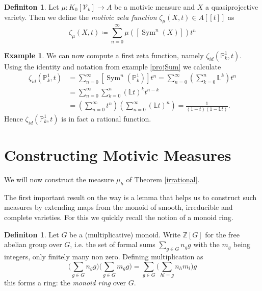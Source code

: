 \documentclass[11pt, a4paper, german]{article}
\theoremstyle{plain}
\theoremstyle{definition}
\newtheorem{definition}[theorem]{Definiton}
\newtheorem{example}[theorem]{Example}
\newcommand{\gring}[1][k]{K_0[\mathcal{V}_#1]}
\DeclareMathOperator{\Sym}{Sym}
\begin{document}
\begin{definition}
    Let $\mu \colon \gring \to A$ be a motivic measure and $X$ a quasiprojective variety. Then we define the \emph{motivic zeta function} 
    $\zeta_{\mu}(X,t) \in A[[t]]$ as
    \[
        \zeta_{\mu}(X,t) \coloneqq \sum_{n=0}^\infty \mu([\Sym^n(X)])t^n
    \]
\end{definition}

\begin{example}
    We can now compute a first zeta function, namely $\zeta_{id}(\mathbb{P}_k^1, t)$. Using the identity and notation from example \ref{projSum}
    we calculate
    \begin{align*}
        \zeta_{id}(\mathbb{P}_k^1, t) & = \sum_{n=0}^\infty \left[\Sym^n({\mathbb{P}_k^1})\right]t^n 
                                       = \sum_{n=0}^\infty \left(\sum_{k=0}^n \mathbb{L}^k\right) t^n \\
                                       & = \sum_{n=0}^\infty \sum_{k=0}^n \left(\mathbb{L}t\right)^k t^{n-k} \\
                                      & = \left( \sum_{n=0}^\infty t^n \right) \left( \sum_{n=0}^\infty (\mathbb{L}t)^n \right) 
                                        = \frac{1}{(1-t)(1-\mathbb{L}t)} .%
    \end{align*}
    Hence $\zeta_{id}(\mathbb{P}_k^1, t)$ is in fact a rational function.
\end{example}

\section{Constructing Motivic Measures}
\label{const}
We will now construct the measure $\mu_h$ of Theorem \ref{irrational}.

The first important result on the way is a lemma that helps us to construct such measures by extending maps from the monoid of smooth, irreducible
and complete varieties. For this we quickly recall the notion of a monoid ring.

\begin{definition}
    Let $G$ be a (multiplicative) monoid. Write $\mathbb{Z}[G]$ for the free abelian group over $G$, i.e. the set of formal sums
    $\sum_{g \in G} n_g g$ with the $m_g$ being integers, only finitely many non zero.
    Defining multiplication as
    \[
        \Big(\sum_{g \in G} n_g g\Big)\Big(\sum_{g \in G} m_g g \Big) = \sum_{g \in G} \Big(\sum_{hl = g} n_h m_l\Big) g
    \]
    this forms a ring: the \emph{monoid ring} over $G$.
\end{definition}
\end{document}
